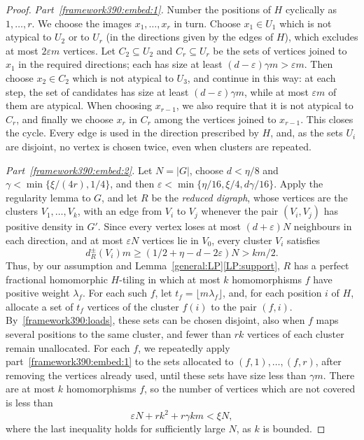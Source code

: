 \begin{proof}
\emph{Part~\ref{framework390:embed:1}.}
Number the positions of $H$ cyclically as $1,\ldots,r$. We choose the images $x_1,\ldots,x_r$ in turn. Choose $x_1\in U_1$ which is not atypical to $U_2$ or to $U_r$ (in the directions given by the edges of $H$), which excludes at most $2\varepsilon m$ vertices.
Let $C_2\subseteq U_2$ and $C_r\subseteq U_r$ be the sets of vertices joined to $x_1$ in the required directions; each has size
at least $(d-\varepsilon)\gamma m>\varepsilon m$.
Then choose $x_2\in C_2$ which is not atypical to $U_3$, and continue in this way: at each step, the set of candidates has size at least
$(d-\varepsilon)\gamma m$, while at most $\varepsilon m$ of
them are atypical. When choosing $x_{r-1}$, we also require that it is not atypical to
$C_r$, and finally we choose $x_r$ in $C_r$ among the vertices joined to $x_{r-1}$.
This closes the cycle. Every edge is used in the direction prescribed by $H$,
and, as the sets $U_i$ are disjoint, no vertex is chosen twice, even when clusters are repeated.

\emph{Part~\ref{framework390:embed:2}.}
Let $N=|G|$, choose $d<\eta/8$ and
$\gamma<\min\{\xi/(4r),1/4\}$, and then
$\varepsilon<\min\{\eta/16,\xi/4,d\gamma/16\}$.
Apply the regularity lemma to $G$, and let $R$ be the \emph{reduced digraph}, whose vertices are the clusters $V_1,\ldots,V_k$, with an edge from $V_i$ to $V_j$ whenever the pair $(V_i,V_j)$ has positive density in $G'$. Since every vertex loses at most $(d+\varepsilon)N$ neighbours in each direction, and at most $\varepsilon N$ vertices lie in $V_0$, every cluster $V_i$ satisfies
\[
 d_R^\pm(V_i)m\ge(1/2+\eta-d-2\varepsilon)N>km/2.
\]
Thus, by our assumption and Lemma~\ref{general:LP}\ref{LP:support}, $R$ has a perfect fractional homomorphic $H$-tiling in which at most $k$ homomorphisms $f$ have positive weight $\lambda_f$.
For each such $f$, let $t_f=\lfloor m\lambda_f\rfloor$, and, for each position $i$ of $H$, allocate a set of $t_f$ vertices of the cluster $f(i)$ to the pair $(f,i)$. By~\eqref{framework390:loads}, these sets can be chosen disjoint, also when $f$ maps several positions to the same cluster, and
fewer than $rk$ vertices of each cluster remain unallocated.
For each $f$, we repeatedly apply part~\ref{framework390:embed:1} to the sets allocated to $(f,1),\ldots,(f,r)$, after removing the vertices already used, until these sets have size less than $\gamma m$. There are at most $k$ homomorphisms $f$,
so the number of vertices which are not covered is less than
\[
 \varepsilon N+rk^2+r\gamma km<\xi N,
\]
where the last inequality holds for sufficiently large $N$, as $k$ is bounded.
\end{proof}

